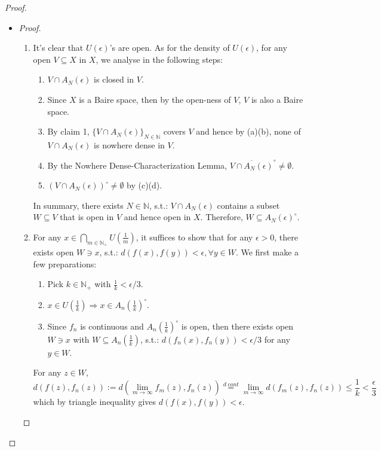 \begin{proof}
\begin{itemize}
        \item \begin{proof}
            \begin{enumerate}
                \item It's clear that $U(\epsilon)$'s are open. As for the density of $U(\epsilon)$, for any open $V \subseteq X$ in $X$, we analyse in the following steps:
                \begin{enumerate}
                    \item $V \cap A_N(\epsilon)$ is closed in $V$.
                    \item Since $X$ is a Baire space, then by the open-ness of $V$, $V$ is also a Baire space.
                    \item By claim 1, $\{ V \cap A_N(\epsilon)\}_{N \in \mathbb{N}}$ covers $V$ and hence by (a)(b), none of $V \cap A_N(\epsilon)$ is nowhere dense in $V$.
                    \item By the Nowhere Dense-Characterization Lemma, $\overline{V \cap A_N(\epsilon)}^\circ \neq \emptyset$.
                    \item $(V \cap A_N(\epsilon))^\circ \neq \emptyset$ by (c)(d).
                \end{enumerate}
                In summary, there exists $N \in \mathbb{N}$, s.t.: $V \cap A_N(\epsilon)$ contains a subset $W \subseteq V$ that is open in $V$ and hence open in $X$. Therefore, $W \subseteq A_N(\epsilon)^\circ$.

                \item For any $x \in \bigcap_{m \in \mathbb{N}_+} U(\frac{1}{m})$, it suffices to show that for any $\epsilon>0$, there exists open $W \ni x$, s.t.: $d(f(x),f(y))< \epsilon, \forall y \in W$. We first make a few preparations:
                \begin{enumerate}
                    \item Pick $k \in \mathbb{N}_+$ with $\frac{1}{k}< \epsilon/3$.
                    \item $x \in U(\frac{1}{k}) \Rightarrow x \in A_n (\frac{1}{k})^\circ$.
                    \item Since $f_n$ is continuous and $A_n(\frac{1}{k})^\circ$ is open, then there exists open $W \ni x$ with $W \subseteq A_n(\frac{1}{k})$, s.t.: $d(f_n(x),f_n(y)) < \epsilon/3$ for any $y \in W$.
                \end{enumerate}
                For any $z \in W$, 
                $$d(f(z),f_n(z)) := d(\lim_{m \to \infty} f_m(z),f_n(z)) \overset{d\;cont}{=} \lim_{m \to \infty} d(f_m(z),f_n(z)) \leq \frac{1}{k} < \frac{\epsilon}{3}$$
                which by triangle inequality gives $d(f(x),f(y)) < \epsilon$.
            \end{enumerate}
        \end{proof}
    \end{itemize}
\end{proof}